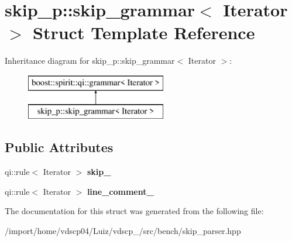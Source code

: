 \section{skip\+\_\+p\+:\+:skip\+\_\+grammar$<$ Iterator $>$ Struct Template Reference}
\label{structskip__p_1_1skip__grammar}
Inheritance diagram for skip\+\_\+p\+:\+:skip\+\_\+grammar$<$ Iterator $>$\+:\begin{figure}[H]
\begin{center}
\leavevmode
\includegraphics[height=2.000000cm]{structskip__p_1_1skip__grammar}
\end{center}
\end{figure}
\subsection*{Public Attributes}
\begin{DoxyCompactItemize}
\item 
qi\+::rule$<$ Iterator $>$ {\bfseries skip\+\_\+}\label{structskip__p_1_1skip__grammar_ae0feb7886ff25cd5363083242bb41239}

\item 
qi\+::rule$<$ Iterator $>$ {\bfseries line\+\_\+comment\+\_\+}\label{structskip__p_1_1skip__grammar_a1cf07ff2e793ae00e4181b23ea9ace2c}

\end{DoxyCompactItemize}


The documentation for this struct was generated from the following file\+:\begin{DoxyCompactItemize}
\item 
/import/home/vdscp04/\+Luiz/vdscp\+\_/src/bench/skip\+\_\+parser.\+hpp\end{DoxyCompactItemize}
